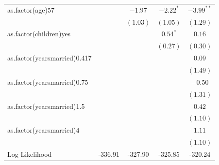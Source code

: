 \documentclass{beamer}
\newcommand{\1}{\mathbb{1}}
\begin{document}
\begin{frame}
\begin{table}[hb!]
\begin{center}
\begin{tabular}{l c c c c }
as.factor(age)57             &               & $-1.97$     & $-2.22^{*}$ & $-3.99^{**}$ \\
                             &               & $(1.03)$    & $(1.05)$    & $(1.29)$     \\
as.factor(children)yes       &               &             & $0.54^{*}$  & $0.16$       \\
                             &               &             & $(0.27)$    & $(0.30)$     \\
as.factor(yearsmarried)0.417 &               &             &             & $0.09$       \\
                             &               &             &             & $(1.49)$     \\
as.factor(yearsmarried)0.75  &               &             &             & $-0.50$      \\
                             &               &             &             & $(1.31)$     \\
as.factor(yearsmarried)1.5   &               &             &             & $0.42$       \\
                             &               &             &             & $(1.10)$     \\
as.factor(yearsmarried)4     &               &             &             & $1.11$       \\
                             &               &             &             & $(1.10)$     \\
\midrule
Log Likelihood               & -336.91       & -327.90     & -325.85     & -320.24      \\
\bottomrule
\end{tabular}
\end{center}
\end{table}
\end{frame}
\end{document}
